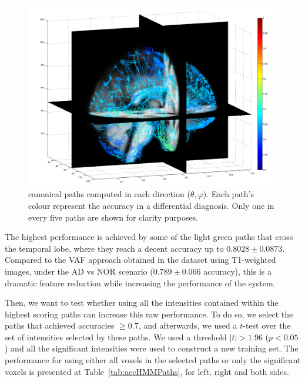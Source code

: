 \begin{figure}
	\myfloatalign
		\includegraphics[width=0.8\columnwidth]{Graphics/ch6/accuracyPaths2}
		\caption{canonical paths computed in each direction ($\theta,\varphi$). Each path's colour represent the accuracy in a differential diagnosis. Only one in every five paths are shown for clarity purposes.}
		\label{fig:accuracyMap}
\end{figure}

The highest performance is achieved by some of the light green paths that cross the temporal lobe, where they reach a decent accuracy up to $0.8028\pm0.0873$. Compared to the \ac{VAF} approach obtained in the \adnimri{} dataset using T1-weighted images, under the AD vs NOR scenario ($0.789 \pm 0.066$ accuracy), this is a dramatic feature reduction while increasing the performance of the system. 

Then, we want to test whether using all the intensities contained within the highest scoring paths can increase this raw performance. To do so, we select the paths that achieved accuracies $\ge0.7$, and afterwards, we used a $t$-test over the set of intensities selected by these paths. We used a threshold $|t|>1.96$ ($p<0.05$) and all the significant intensities were used to construct a new training set. The performance for using either all voxels in the selected paths or only the significant voxels is presented at Table~\ref{tab:accHMMPaths}, for left, right and both sides. 

